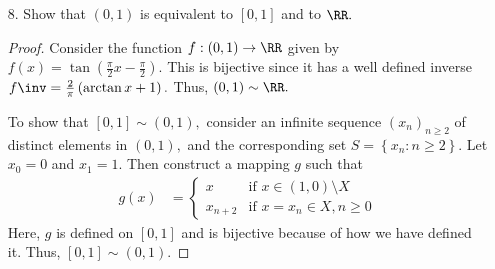 \documentclass{article}
\begin{document}
\begin{itemize}
\begin{proof}
			Since $g$ is injective, it is a bijection from $C\to g(C)=\left\{ g(c):c\in C \right\}.$ Since $g(C)\subset A,$ it is countable, so there exists a bijection $h:g(C)\to A.$ Thus, the composition $h\circ g:C\to g(C)\to A$ is a bijection, so $C\sim A$ and thus $C$ is countable.
		\end{proof}

	\item[8.] Show that $(0, 1)$ is equivalent to $[0, 1]$ and to $\RR.$
		\begin{proof}
			Consider the function $f:(0, 1)\to\RR$ given by $f(x)=\tan\left( \frac{\pi}{2}x - \frac{\pi}{2} \right).$ This is bijective since it has a well defined inverse $f\inv = \frac{2}{\pi}\left( \arctan x + 1 \right).$ Thus, $(0, 1)\sim\RR.$

			To show that $[0, 1]\sim (0, 1),$ consider an infinite sequence $(x_n)_{n\ge 2}$ of distinct elements in $(0, 1),$ and the corresponding set $S=\left\{ x_n: n\ge 2 \right\}.$ Let $x_0=0$ and $x_1=1.$ Then construct a mapping $g$ such that
			\begin{align*}
				g(x) &= \begin{cases}
					x & \text{if }x\in(1, 0)\setminus X \\
					x_{n+2} & \text{if }x=x_n\in X, n\ge 0
				\end{cases}
			\end{align*}
			Here, $g$ is defined on $[0, 1]$ and is bijective because of how we have defined it. Thus, $[0, 1]\sim(0, 1).$
	\end{proof}


\end{itemize}
\end{document}
